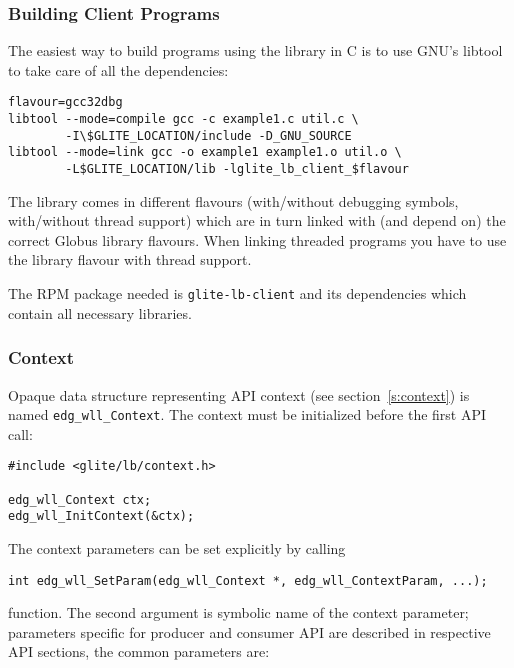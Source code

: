 \subsubsection{Building Client Programs}
The easiest way to build programs using the \LB library in C is to use
GNU's libtool to take care of all the dependencies:
\begin{verbatim}
flavour=gcc32dbg
libtool --mode=compile gcc -c example1.c util.c \
        -I\$GLITE_LOCATION/include -D_GNU_SOURCE
libtool --mode=link gcc -o example1 example1.o util.o \
        -L$GLITE_LOCATION/lib -lglite_lb_client_$flavour
\end{verbatim}
The library comes in different flavours (with/without debugging
symbols, with/without thread support) which are in turn linked with
(and depend on) the correct Globus library flavours. When linking
threaded programs you have to use the library flavour with thread
support.

The RPM package needed is \texttt{glite-lb-client} and its dependencies
which contain all necessary libraries. 

\subsubsection{Context}
\label{s:edg_wll_context}
%
Opaque data structure representing \LB API context (see
section~\ref{s:context}) is named \verb'edg_wll_Context'.
The context must be initialized before the first \LB API call:
\begin{lstlisting}
#include <glite/lb/context.h>

edg_wll_Context ctx;
edg_wll_InitContext(&ctx);
\end{lstlisting}

%
The context parameters can be set explicitly by calling
\begin{lstlisting}
int edg_wll_SetParam(edg_wll_Context *, edg_wll_ContextParam, ...);
\end{lstlisting}
function. The second argument is symbolic name of the context
parameter; parameters specific for producer and consumer API are
described in respective API sections, the common parameters are:

